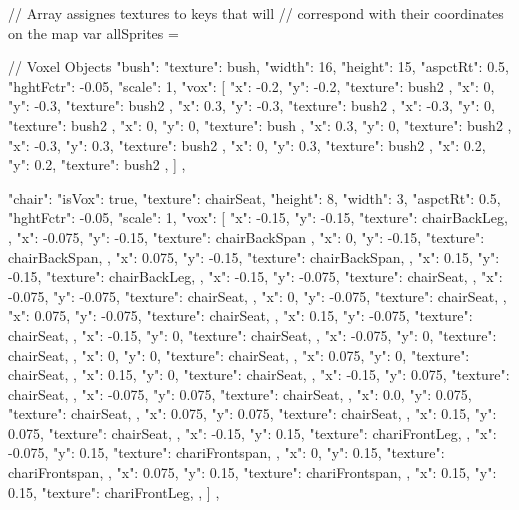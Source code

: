 // Array assignes textures to keys that will
// correspond with their coordinates on the map
var allSprites = {

  // Voxel Objects
  "bush": {
    "texture": bush,
    "width": 16,
    "height": 15,
    "aspctRt": 0.5,
    "hghtFctr": -0.05,
    "scale": 1,
    "vox": [
      { "x": -0.2, "y": -0.2, "texture": bush2 },
      { "x": 0, "y": -0.3, "texture": bush2 },
      { "x": 0.3, "y": -0.3, "texture": bush2 },
      { "x": -0.3, "y": 0, "texture": bush2 },
      { "x": 0, "y": 0, "texture": bush },
      { "x": 0.3, "y": 0, "texture": bush2 },
      { "x": -0.3, "y": 0.3, "texture": bush2 },
      { "x": 0, "y": 0.3, "texture": bush2 },
      { "x": 0.2, "y": 0.2, "texture": bush2 },
    ]
  },  

  "chair": {
    "isVox": true,
    "texture": chairSeat,
    "height": 8,
    "width": 3,
    "aspctRt": 0.5,
    "hghtFctr": -0.05,
    "scale": 1,
    "vox": [
      { "x": -0.15, "y": -0.15, "texture": chairBackLeg, },
      { "x": -0.075, "y": -0.15, "texture": chairBackSpan },
      { "x": 0,    "y": -0.15, "texture": chairBackSpan, },
      { "x": 0.075,  "y": -0.15, "texture": chairBackSpan, },
      { "x": 0.15,  "y": -0.15, "texture": chairBackLeg, },
      { "x": -0.15,   "y": -0.075, "texture": chairSeat, },
      { "x": -0.075,   "y": -0.075, "texture": chairSeat, },
      { "x": 0,      "y": -0.075, "texture": chairSeat, },
      { "x": 0.075,    "y": -0.075, "texture": chairSeat, },
      { "x": 0.15,    "y": -0.075, "texture": chairSeat, },
      { "x": -0.15,  "y": 0, "texture": chairSeat, },
      { "x": -0.075,  "y": 0, "texture": chairSeat, },
      { "x": 0,     "y": 0, "texture": chairSeat, },
      { "x": 0.075,   "y": 0, "texture": chairSeat, },
      { "x": 0.15,   "y": 0, "texture": chairSeat, },
      { "x": -0.15,  "y": 0.075, "texture": chairSeat, },
      { "x": -0.075,  "y": 0.075, "texture": chairSeat, },
      { "x": 0.0,   "y": 0.075, "texture": chairSeat, },
      { "x": 0.075,   "y": 0.075, "texture": chairSeat, },
      { "x": 0.15,   "y": 0.075, "texture": chairSeat, },
      { "x": -0.15, "y": 0.15, "texture": chariFrontLeg, },
      { "x": -0.075, "y": 0.15, "texture": chariFrontspan, },
      { "x": 0,    "y": 0.15, "texture": chariFrontspan, },
      { "x": 0.075,  "y": 0.15, "texture": chariFrontspan, },
      { "x": 0.15,  "y": 0.15, "texture": chariFrontLeg, },
    ]
  },  


}
